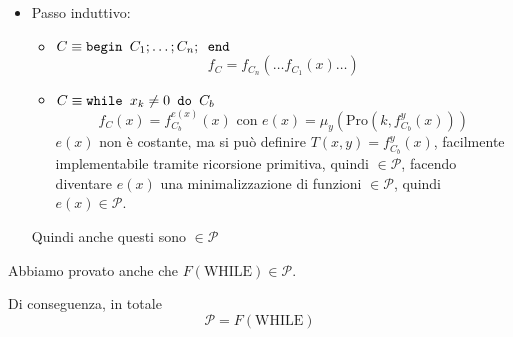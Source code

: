 \documentclass[12pt, answers]{exam}
\theoremstyle{plain}
\newcommand{\while}{\text{WHILE}}
\newcommand{\cp}{\mathcal{P}}
\newcommand{\pro}{\text{Pro}}
\begin{document}
\begin{questions}
\begin{solution}
\begin{itemize}
                \item Passo induttivo: 
                \begin{itemize}
                    \item $C \equiv \text{\texttt{begin }} C_1; \dots; C_n; \text{\texttt{ end}}$
                    $$ f_C = f_{C_n} ( \dots f_{C_1}(x) \dots )$$
                    
                    \item $C \equiv \text{\texttt{while }} x_k \neq 0 \text{\texttt{ do }} C_b$
                    $$ f_C (x) = f_{C_b}^{e(x)} (x) \text{ con } e(x) = \mu_y (\pro(k, f_{C_b}^y (x))) $$
                    $e(x)$ non è costante, ma si può definire $T(x,y) = f_{C_b}^y (x)$, facilmente implementabile tramite ricorsione primitiva, quindi $\in \cp$, facendo diventare $e(x)$ una minimalizzazione di funzioni $\in \cp$, quindi $e(x) \in \cp$. 
                \end{itemize}
                Quindi anche questi sono $\in \cp$
            \end{itemize}
            Abbiamo provato anche che $F(\while) \in \cp$.
            
            Di conseguenza, in totale
            $$ \cp = F(\while) $$ 
        \end{solution}
    \end{questions}
\end{document}
